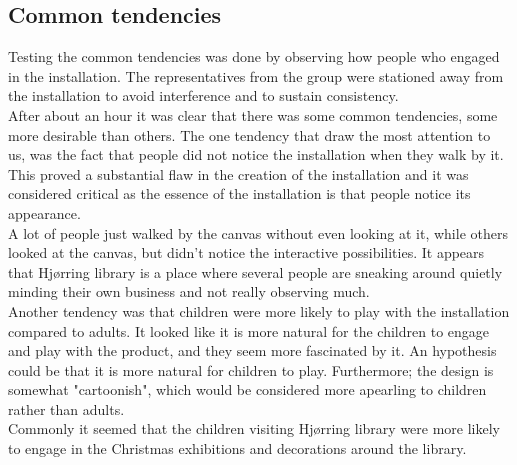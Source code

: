 \subsection{Common tendencies}
Testing the common tendencies was done by observing how people who engaged in the installation. The representatives from the group were stationed away from the installation to avoid interference and to sustain consistency.\\ 
After about an hour it was clear that there was some common tendencies, some more desirable than others. The one tendency that draw the most attention to us, was the fact that people did not notice the installation when they walk by it. This proved a substantial flaw in the creation of the installation and it was considered critical as the essence of the installation is that people notice its appearance.\\
A lot of people just walked by the canvas without even looking at it, while others looked at the canvas, but didn't notice the interactive possibilities. It appears that Hj{\o}rring library is a place where several people are sneaking around quietly minding their own business and not really observing much.\\
Another tendency was that children were more likely to play with the installation compared to adults. It looked like it is more natural for the children to engage and play with the product, and they seem more fascinated by it. An hypothesis could be that it is more natural for children to play. Furthermore; the design is somewhat "cartoonish", which would be considered more apearling to children rather than adults.\\
Commonly it seemed that the children visiting Hj{\o}rring library were more likely to engage in the Christmas exhibitions and decorations around the library.

